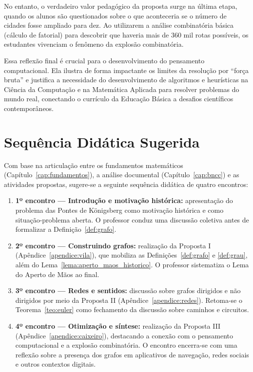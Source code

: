 \documentclass[
  12pt,
  oneside,
  a4paper,
  english,
  brazilian
  ]{abntex2}
\theoremstyle{definition}
\begin{document}
No entanto, o verdadeiro valor pedagógico da proposta surge na última etapa, quando os alunos são questionados sobre o que aconteceria se o número de cidades fosse ampliado para dez. Ao utilizarem a análise combinatória básica (cálculo de fatorial) para descobrir que haveria mais de 360 mil rotas possíveis, os estudantes vivenciam o fenômeno da explosão combinatória.

Essa reflexão final é crucial para o desenvolvimento do pensamento computacional. Ela ilustra de forma impactante os limites da resolução por ``força bruta'' e justifica a necessidade do desenvolvimento de algoritmos e heurísticas na Ciência da Computação e na Matemática Aplicada para resolver problemas do mundo real, conectando o currículo da Educação Básica a desafios científicos contemporâneos.

\section{Sequência Didática Sugerida}
\label{sec:sequencia_didatica}

Com base na articulação entre os fundamentos matemáticos (Capítulo~\ref{cap:fundamentos}), a análise documental (Capítulo~\ref{cap:bncc}) e as atividades propostas, sugere-se a seguinte sequência didática de quatro encontros:

\begin{enumerate}
  \item \textbf{1º encontro --- Introdução e motivação histórica:} apresentação do problema das Pontes de Königsberg como motivação histórica e como situação-problema aberta. O professor conduz uma discussão coletiva antes de formalizar a Definição~\ref{def:grafo}.
  \item \textbf{2º encontro --- Construindo grafos:} realização da Proposta I (Apêndice~\ref{apendice:vila}), que mobiliza as Definições~\ref{def:grafo} e \ref{def:grau}, além do Lema~\ref{lema:aperto_maos_historico}. O professor sistematiza o Lema do Aperto de Mãos ao final.
  \item \textbf{3º encontro --- Redes e sentidos:} discussão sobre grafos dirigidos e não dirigidos por meio da Proposta II (Apêndice~\ref{apendice:redes}). Retoma-se o Teorema~\ref{teo:euler} como fechamento da discussão sobre caminhos e circuitos.
  \item \textbf{4º encontro --- Otimização e síntese:} realização da Proposta III (Apêndice~\ref{apendice:caixeiro}), destacando a conexão com o pensamento computacional e a explosão combinatória. O encontro encerra-se com uma reflexão sobre a presença dos grafos em aplicativos de navegação, redes sociais e outros contextos digitais.
\end{enumerate}
\end{document}
